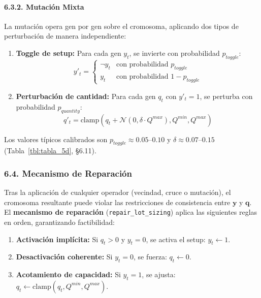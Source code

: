 \documentclass[
  spanish,
  12pt,
]{article}
\providecommand{\tightlist}{%
  \setlength{\itemsep}{0pt}\setlength{\parskip}{0pt}}
\begin{document}
\paragraph{6.3.2. Mutación Mixta}\label{mutaciuxf3n-mixta}

La mutación opera gen por gen sobre el cromosoma, aplicando dos tipos de
perturbación de manera independiente:

\begin{enumerate}
\def\labelenumi{\arabic{enumi}.}
\item
  \textbf{Toggle de setup:} Para cada gen \(y_t\), se invierte con
  probabilidad \(p_{toggle}\):
  \[y'_t = \begin{cases} \neg y_t & \text{con probabilidad } p_{toggle} \\ y_t & \text{con probabilidad } 1 - p_{toggle} \end{cases}\]
\item
  \textbf{Perturbación de cantidad:} Para cada gen \(q_t\) con
  \(y'_t = 1\), se perturba con probabilidad \(p_{quantity}\):
  \[q'_t = \text{clamp}(q_t + \mathcal{N}(0, \delta \cdot Q^{max}), Q^{min}, Q^{max})\]
\end{enumerate}

Los valores típicos calibrados son \(p_{toggle} \approx 0.05\)--\(0.10\)
y \(\delta \approx 0.07\)--\(0.15\) (Tabla~\ref{tbl:tabla_5d}, §6.11).

\subsubsection{6.4. Mecanismo de
Reparación}\label{mecanismo-de-reparaciuxf3n}

Tras la aplicación de cualquier operador (vecindad, cruce o mutación),
el cromosoma resultante puede violar las restricciones de consistencia
entre \(\mathbf{y}\) y \(\mathbf{q}\). El \textbf{mecanismo de
reparación} (\texttt{repair\_lot\_sizing}) aplica las siguientes reglas
en orden, garantizando factibilidad:

\begin{enumerate}
\def\labelenumi{\arabic{enumi}.}
\tightlist
\item
  \textbf{Activación implícita:} Si \(q_t > 0\) y \(y_t = 0\), se activa
  el setup: \(y_t \leftarrow 1\).
\item
  \textbf{Desactivación coherente:} Si \(y_t = 0\), se fuerza:
  \(q_t \leftarrow 0\).
\item
  \textbf{Acotamiento de capacidad:} Si \(y_t = 1\), se ajusta:
  \(q_t \leftarrow \text{clamp}(q_t, Q^{min}, Q^{max})\).
\end{enumerate}
\end{document}
